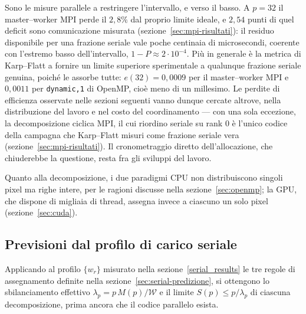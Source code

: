 Sono le misure parallele a restringere l'intervallo, e verso il basso. A $p=32$
il master--worker MPI perde il $2{,}8\%$ dal proprio limite ideale, e $2{,}54$
punti di quel deficit sono comunicazione misurata
(sezione~\ref{sec:mpi-risultati}): il residuo disponibile per una frazione
seriale vale poche centinaia di microsecondi, coerente con l'estremo basso
dell'intervallo, $1-P \approx 2\cdot10^{-4}$. Più in generale è la metrica di
Karp--Flatt a fornire un limite superiore sperimentale a qualunque frazione
seriale genuina, poiché le assorbe tutte: $e(32) = 0{,}0009$ per il
master--worker MPI e $0{,}0011$ per \texttt{dynamic,1} di OpenMP, cioè meno di
un millesimo. Le perdite di efficienza osservate nelle sezioni seguenti vanno
dunque cercate altrove, nella distribuzione del lavoro e nel costo del
coordinamento --- con una sola eccezione, la decomposizione ciclica MPI, il cui
riordino seriale su rank $0$ è l'unico codice della campagna che Karp--Flatt
misuri come frazione seriale vera (sezione~\ref{sec:mpi-risultati}). Il
cronometraggio diretto dell'allocazione, che chiuderebbe la questione, resta fra
gli sviluppi del lavoro.

Quanto alla decomposizione, i due paradigmi CPU non distribuiscono singoli pixel
ma righe intere, per le ragioni discusse nella sezione~\ref{sec:openmp}; la GPU,
che dispone di migliaia di thread, assegna invece a ciascuno un solo pixel
(sezione~\ref{sec:cuda}).

\subsection{Previsioni dal profilo di carico seriale}
\label{sec:serial-pred-lambdaP}

Applicando al profilo $\{w_r\}$ misurato nella sezione~\ref{serial_results} le
tre regole di assegnamento definite nella sezione~\ref{sec:serial-predizione}, si
ottengono lo sbilanciamento effettivo $\lambda_p = p\,M(p)/\mathcal{W}$ e il
limite $S(p) \le p/\lambda_p$ di ciascuna decomposizione, prima ancora che il
codice parallelo esista.

